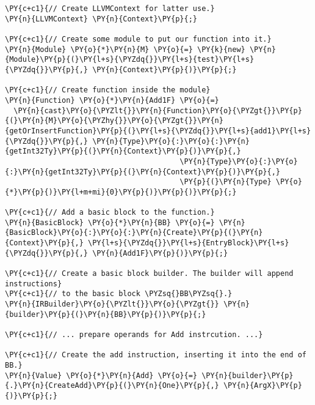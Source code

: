 \begin{Verbatim}[commandchars=\\\{\}]
\PY{c+c1}{// Create LLVMContext for latter use.}
\PY{n}{LLVMContext} \PY{n}{Context}\PY{p}{;}

\PY{c+c1}{// Create some module to put our function into it.}
\PY{n}{Module} \PY{o}{*}\PY{n}{M} \PY{o}{=} \PY{k}{new} \PY{n}{Module}\PY{p}{(}\PY{l+s}{\PYZdq{}}\PY{l+s}{test}\PY{l+s}{\PYZdq{}}\PY{p}{,} \PY{n}{Context}\PY{p}{)}\PY{p}{;}

\PY{c+c1}{// Create function inside the module}
\PY{n}{Function} \PY{o}{*}\PY{n}{Add1F} \PY{o}{=}
  \PY{n}{cast}\PY{o}{\PYZlt{}}\PY{n}{Function}\PY{o}{\PYZgt{}}\PY{p}{(}\PY{n}{M}\PY{o}{\PYZhy{}}\PY{o}{\PYZgt{}}\PY{n}{getOrInsertFunction}\PY{p}{(}\PY{l+s}{\PYZdq{}}\PY{l+s}{add1}\PY{l+s}{\PYZdq{}}\PY{p}{,} \PY{n}{Type}\PY{o}{:}\PY{o}{:}\PY{n}{getInt32Ty}\PY{p}{(}\PY{n}{Context}\PY{p}{)}\PY{p}{,}
                                        \PY{n}{Type}\PY{o}{:}\PY{o}{:}\PY{n}{getInt32Ty}\PY{p}{(}\PY{n}{Context}\PY{p}{)}\PY{p}{,}
                                        \PY{p}{(}\PY{n}{Type} \PY{o}{*}\PY{p}{)}\PY{l+m+mi}{0}\PY{p}{)}\PY{p}{)}\PY{p}{;}

\PY{c+c1}{// Add a basic block to the function.}
\PY{n}{BasicBlock} \PY{o}{*}\PY{n}{BB} \PY{o}{=} \PY{n}{BasicBlock}\PY{o}{:}\PY{o}{:}\PY{n}{Create}\PY{p}{(}\PY{n}{Context}\PY{p}{,} \PY{l+s}{\PYZdq{}}\PY{l+s}{EntryBlock}\PY{l+s}{\PYZdq{}}\PY{p}{,} \PY{n}{Add1F}\PY{p}{)}\PY{p}{;}

\PY{c+c1}{// Create a basic block builder. The builder will append instructions}
\PY{c+c1}{// to the basic block \PYZsq{}BB\PYZsq{}.}
\PY{n}{IRBuilder}\PY{o}{\PYZlt{}}\PY{o}{\PYZgt{}} \PY{n}{builder}\PY{p}{(}\PY{n}{BB}\PY{p}{)}\PY{p}{;}

\PY{c+c1}{// ... prepare operands for Add instrcution. ...}

\PY{c+c1}{// Create the add instruction, inserting it into the end of BB.}
\PY{n}{Value} \PY{o}{*}\PY{n}{Add} \PY{o}{=} \PY{n}{builder}\PY{p}{.}\PY{n}{CreateAdd}\PY{p}{(}\PY{n}{One}\PY{p}{,} \PY{n}{ArgX}\PY{p}{)}\PY{p}{;}
\end{Verbatim}
